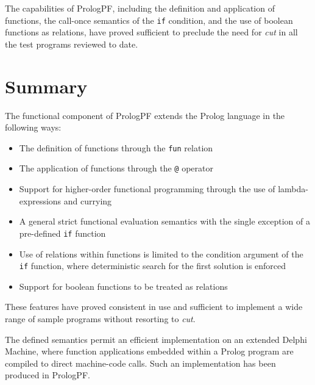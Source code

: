 The capabilities of PrologPF, including the definition and application of
functions, the call-once semantics of the \texttt{if} condition, and the
use of boolean functions as relations, have proved sufficient to preclude the
need for \textit{cut} in all the test programs reviewed to date.

\section{Summary} %

The functional component of PrologPF extends
the Prolog language in the following ways:
\begin{itemize}
\item{The definition of functions through the \texttt{fun} relation}
\item{The application of functions through the \texttt{@} operator}
\item{Support for higher-order functional programming through the
  use of lambda-expressions and currying}
\item{A general strict functional evaluation semantics with
  the single exception of
  a pre-defined \texttt{if} function}
\item{Use of relations within functions is limited to the condition
  argument of the \texttt{if} function, where deterministic search for
  the first solution is enforced}
\item{Support for boolean functions to be treated as relations}
\end{itemize}

These features have proved consistent in use and sufficient to implement
a wide range of sample programs without resorting to \textit{cut}.

The defined semantics permit
an efficient implementation on an extended Delphi Machine, 
where function applications
embedded within a Prolog program are compiled to direct machine-code
calls.  Such an implementation has been produced in PrologPF.
